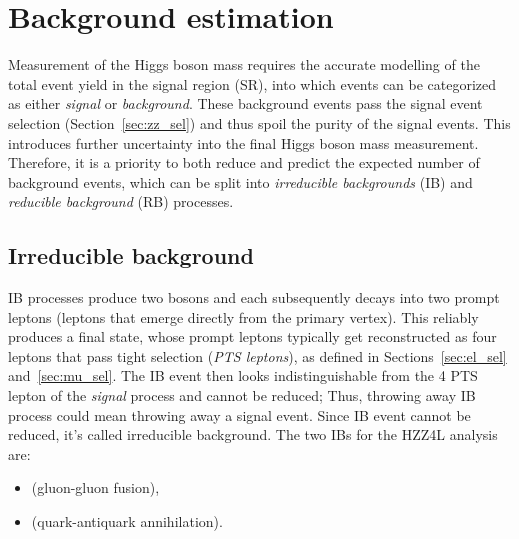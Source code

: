 \section{Background estimation}
\label{sec:bkg_estim}
Measurement of the Higgs boson mass requires the accurate modelling of the total event yield in the signal region (SR), into which events can be categorized as either \emph{signal} or \emph{background}.
These background events pass the signal event selection (Section~\ref{sec:zz_sel}) and thus spoil the purity of the signal events.
This introduces further uncertainty into the final Higgs boson mass measurement.
Therefore, it is a priority to both reduce and predict the expected number of background events, which can be split into \emph{irreducible backgrounds} (IB) and \emph{reducible background} (RB) processes.

\subsection{Irreducible background}
\label{sec:bkg_irred}
IB processes produce two \PZ bosons and each \PZ subsequently decays into two prompt leptons (leptons that emerge directly from the primary vertex).
This reliably produces a \fourl final state, whose prompt leptons typically get reconstructed as four leptons that pass tight selection (\emph{PTS leptons}), as defined in Sections~\ref{sec:el_sel} and~\ref{sec:mu_sel}.
The IB event then looks indistinguishable from the 4 PTS lepton of the \emph{signal} process and cannot be reduced;
Thus, throwing away IB process could mean throwing away a signal event.
Since IB event cannot be reduced, it's called irreducible background.
The two IBs for the HZZ4L analysis are:
\begin{itemize}
    \item \ggzzfourl (gluon-gluon fusion),
    \item \qqggzzfourl (quark-antiquark annihilation).
\end{itemize}

